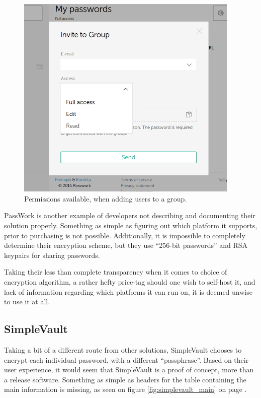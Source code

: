 			\begin{figure}[htbp]
				\centering
				\includegraphics[width=0.95\textwidth]{figures/analysis/passwork_adduser_cropped.png}
				\caption{Permissions available, when adding users to a group.}
				\label{fig:passwork_adduser}
			\end{figure}

			PassWork is another example of developers not describing and documenting their solution properly. Something as simple as figuring out which platform it supports, prior to purchasing is not possible. Additionally, it is impossible to completely determine their encryption scheme, but they use ``256-bit passwords'' and RSA keypairs for sharing passwords. 

			Taking their less than complete transparency when it comes to choice of encryption algorithm, a rather hefty price-tag should one wish to self-host it, and lack of information regarding which platforms it can run on, it is deemed unwise to use it at all.


		\subsection*{SimpleVault}
			Taking a bit of a different route from other solutions, SimpleVault\cite{simplevault} chooses to encrypt each individual password, with a different ``passphrase''. Based on their user experience, it would seem that SimpleVault is a proof of concept, more than a release software. Something as simple as headers for the table containing the main information is missing, as seen on figure \ref{fig:simplevault_main} on page \pageref{fig:simplevault_main}.

